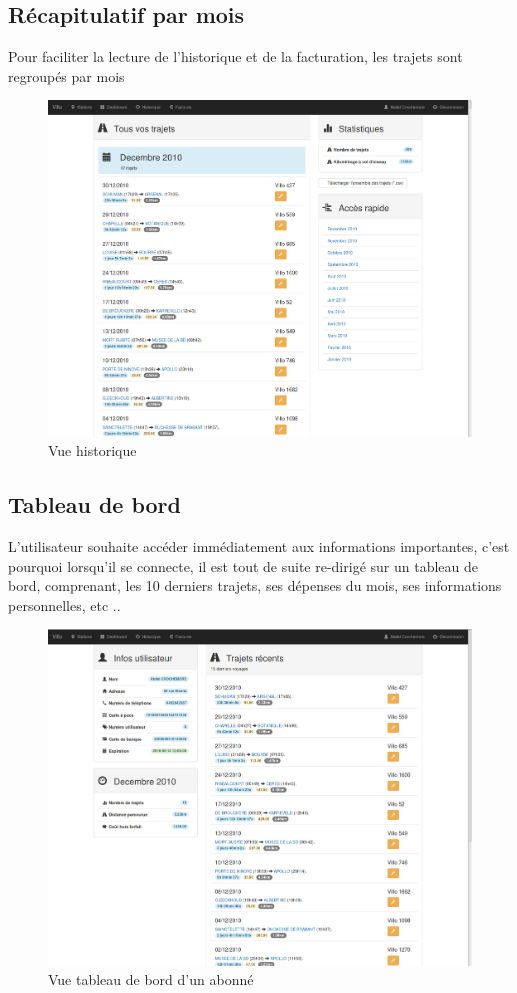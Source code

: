 \documentclass[a4paper,10pt]{article}
\begin{document}
\subsection{Récapitulatif par mois}
Pour faciliter la lecture de l'historique et de la facturation, les trajets sont
regroupés par mois

\begin{figure}[H]
  \centering
  \includegraphics[scale=0.2]{historique.png}
  \caption{\label{fig:hist} Vue historique}
\end{figure}

\subsection{Tableau de bord}
L'utilisateur souhaite accéder immédiatement aux informations importantes,
c'est pourquoi lorsqu'il se connecte, il est tout de suite re-dirigé sur
un tableau de bord, comprenant, les 10 derniers trajets, ses dépenses du mois,
ses informations personnelles, etc ..

\begin{figure}[H]
  \centering
  \includegraphics[scale=0.2]{Dashboard.png}
  \caption{\label{fig:dashboard} Vue tableau de bord d'un abonné}
\end{figure}
\end{document}
